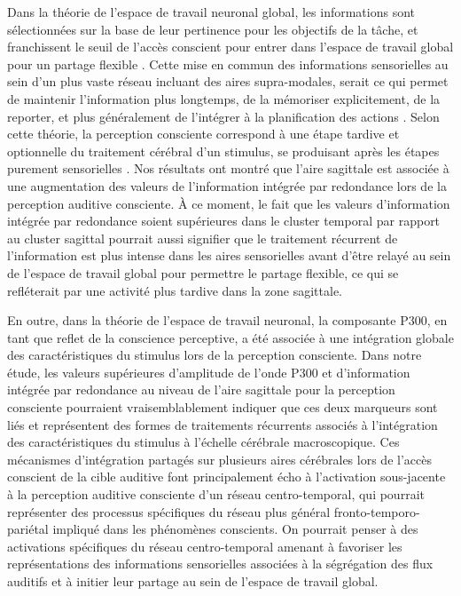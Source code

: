 Dans la théorie de l'espace de travail neuronal global, les informations sont sélectionnées sur la base de leur pertinence pour les objectifs de la tâche, et franchissent le seuil de l'accès conscient pour entrer dans l'espace de travail global pour un partage flexible \citep{dehaene2003neuronal,kemmerer2015we}. 
Cette mise en commun des informations sensorielles au sein d'un plus vaste réseau incluant des aires supra-modales, serait ce qui permet de maintenir l'information plus longtemps, de la mémoriser explicitement, de la reporter, et plus généralement de l'intégrer à la planification des actions \citep{dehaene2014consciousness}.
Selon cette théorie, la perception consciente correspond à une étape tardive et optionnelle du traitement cérébral d'un stimulus, se produisant après les étapes purement sensorielles \citep{khamassi2021neurosciences}.
Nos résultats ont montré que l'aire sagittale est associée à une augmentation des valeurs de l'information intégrée par redondance lors de la perception auditive consciente. 
À ce moment, le fait que les valeurs d'information intégrée par redondance soient supérieures dans le cluster temporal par rapport au cluster sagittal pourrait aussi signifier que le traitement récurrent de l'information est plus intense dans les aires sensorielles avant d'être relayé au sein de l'espace de travail global pour permettre le partage flexible, ce qui se refléterait par une activité plus tardive dans la zone sagittale. 

En outre, dans la théorie de l'espace de travail neuronal, la composante P300, en tant que reflet de la conscience perceptive, a été associée à une intégration globale des caractéristiques du stimulus lors de la perception consciente. 
Dans notre étude, les valeurs supérieures d'amplitude de l'onde P300 et d'information intégrée par redondance au niveau de l'aire sagittale pour la perception consciente pourraient vraisemblablement indiquer que ces deux marqueurs sont liés et représentent des formes de traitements récurrents associés à l'intégration des caractéristiques du stimulus à l'échelle cérébrale macroscopique. 
Ces mécanismes d'intégration partagés sur plusieurs aires cérébrales lors de l'accès conscient de la cible auditive font principalement écho à l'activation sous-jacente à la perception auditive consciente d'un réseau centro-temporal, qui pourrait représenter des processus spécifiques du réseau plus général fronto-temporo-pariétal impliqué dans les phénomènes conscients. 
On pourrait penser à des activations spécifiques du réseau centro-temporal amenant à favoriser les représentations des informations sensorielles associées à la ségrégation des flux auditifs et à initier leur partage au sein de l'espace de travail global. 

